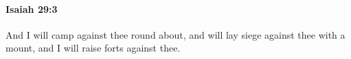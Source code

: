 
		\paragraph{Isaiah 29:3} %
			\label{ISAIAH-29-3}

			And I will camp against thee round about, and will lay siege against thee with a mount, and I will raise forts against thee.


